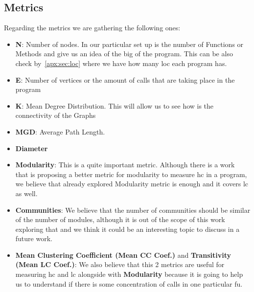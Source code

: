 \documentclass[12pt, a4paper]{article}
\begin{document}
\subsection{Metrics}
Regarding the metrics we are gathering the following ones:

\begin{itemize}
    \item \textbf{N}: Number of nodes. In our particular set up is the number of Functions or Methods and give us an idea of the big of the program.
    This can be also check by~\ref{apx:sec:loc} where we have how many \acrlong{loc} each program has.
    \item \textbf{E}: Number of vertices or the amount of calls that are taking place in the program
    \item \textbf{K}: Mean Degree Distribution. This will allow us to see how is the connectivity of the Graphs
    \item \textbf{MGD}: Average Path Length. 
    \item \textbf{Diameter}
    \item \textbf{Modularity}: This is a quite important metric. Although there is a work~\cite{paper_cohesion} that is proposing a better metric for modularity
     to measure \acrlong{hc} in a program, we believe that already explored Modularity metric is enough and it covers \acrlong{lc} as well.
    \item \textbf{Communities}: We believe that the number of communities should be similar of the number of modules, although it is out of the scope of this work exploring that
    and we think it could be an interesting topic to discuss in a future work.
    \item \textbf{Mean Clustering Coefficient (Mean CC Coef.)} and \textbf{Transitivity (Mean LC Coef.)}: We also believe that this 2 metrics are useful for measuring \acrlong{hc} and \acrlong{lc}
    alongside with \textbf{Modularity} because it is going to help us to understand if there is some concentration of calls in one particular \acrlong{fu}.
\end{itemize}
\end{document}
